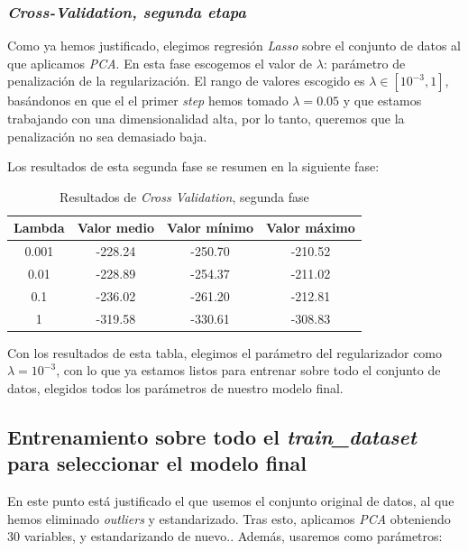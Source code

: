 \documentclass[11pt]{article}
\begin{document}
\subsubsection{\emph{Cross-Validation, segunda etapa}}

Como ya hemos justificado, elegimos regresión \emph{Lasso} sobre el conjunto de datos al que aplicamos \emph{PCA}.
En esta fase escogemos el valor de $\lambda$: parámetro de penalización de la regularización. El rango de valores escogido es $\lambda \in [10^{-3}, 1]$, basándonos en que el el primer \emph{step} hemos tomado $\lambda = 0.05$ y que estamos trabajando con una dimensionalidad alta, por lo tanto, queremos que la penalización no sea demasiado baja.

Los resultados de esta segunda fase se resumen en la siguiente fase:

\begin{table}[H]
    \centering
    \begin{tabular}{|c|c|c|c|}
        \hline
        \textbf{Lambda} & \textbf{Valor medio} & \textbf{Valor mínimo} & \textbf{Valor máximo} \\
        \hline
        0.001 & -228.24 & -250.70 & -210.52 \\
        0.01  & -228.89 & -254.37 & -211.02 \\
        0.1   & -236.02 & -261.20 & -212.81 \\
        1     & -319.58 & -330.61 & -308.83 \\
        \hline
    \end{tabular}
    \caption{Resultados de \emph{Cross Validation}, segunda fase}
\end{table}

Con los resultados de esta tabla, elegimos el parámetro del regularizador como $\lambda = 10^{-3}$, con lo que ya estamos listos para entrenar sobre todo el conjunto de datos, elegidos todos los parámetros de nuestro modelo final.

\pagebreak
\subsection{Entrenamiento sobre todo el \emph{train\_dataset} para seleccionar el modelo final}

En este punto está justificado el que usemos el conjunto original de datos, al que hemos eliminado \emph{outliers} y estandarizado. Tras esto, aplicamos \emph{PCA} obteniendo 30 variables, y estandarizando de nuevo.. Además, usaremos como parámetros:
\end{document}
